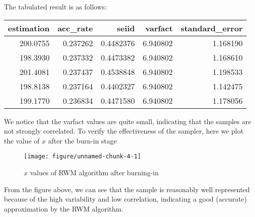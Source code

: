 The tabulated result is as follows:\\
\begin{center}
\begin{knitrout}
\color{fgcolor}
\begin{tabular}{r|r|r|r|r}
\hline
estimation & acc\_rate & seiid & varfact & standard\_error\\
\hline
200.0755 & 0.237262 & 0.4482376 & 6.940802 & 1.168190\\
\hline
198.3930 & 0.237332 & 0.4473382 & 6.940802 & 1.168610\\
\hline
201.4081 & 0.237437 & 0.4538848 & 6.940802 & 1.198533\\
\hline
198.8138 & 0.237164 & 0.4402327 & 6.940802 & 1.142475\\
\hline
199.1770 & 0.236834 & 0.4471580 & 6.940802 & 1.178056\\
\hline
\end{tabular}


\end{knitrout}
\end{center}
We notice that the varfact values are quite small, indicating that the samples are not strongly correlated. To verify the effectiveness of the sampler, here we plot the value of $x$ after the burn-in stage
\begin{figure}[H]
  \centering
\begin{knitrout}
\color{fgcolor}\begin{kframe}
\begin{alltt}
\hlstd{(xlist[(B}\hlopt{+}\hlstd{)}\hlopt{:}\hlopt{+}\hlstd{M)],}\hlstd{=}\hlstd{)}
\end{alltt}
\end{kframe}
\texttt{[image: figure/unnamed-chunk-4-1]} 

\end{knitrout}
		\caption{$x$ values of RWM algorithm after burning-in}
\end{figure}
From the figure above, we can see that the sample is reasonably well represented because of the high variability and low correlation, indicating a good (accurate) approximation by the RWM algorithm.\\

